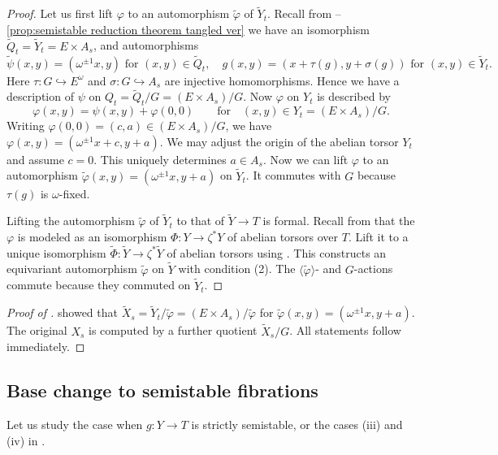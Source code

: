 \documentclass[reqno, letterpaper]{amsart}
\numberwithin{equation}{subsection}
\let\to\longrightarrow
\begin{document}
		\begin{proof}
			Let us first lift $\varphi$ to an automorphism $\tilde \varphi$ of $\tilde Y_t$. Recall from --\ref{prop:semistable reduction theorem tangled ver} we have an isomorphism $\tilde Q_t = \tilde Y_t = E \times A_s$, and automorphisms
			\[ \tilde \psi(x,y) = (\omega^{\pm1} x, y) \mbox{ for } (x,y) \in \tilde Q_t ,\quad g(x,y) = (x + \tau(g), y + \sigma(g)) \mbox{ for } (x,y) \in \tilde Y_t .\]
			Here $\tau : G \hookrightarrow E^\omega$ and $\sigma : G \hookrightarrow A_s$ are injective homomorphisms. Hence we have a description of $\psi$ on $Q_t = \tilde Q_t / G = (E \times A_s)/G$. Now $\varphi$ on $Y_t$ is described by
			\[ \varphi(x,y) = \psi(x,y) + \varphi(0,0) \qquad\mbox{for}\quad (x,y) \in Y_t = (E \times A_s)/G .\]
			Writing $\varphi(0,0) = (c,a) \in (E \times A_s)/G$, we have $\varphi(x,y) = (\omega^{\pm1}x + c, y+a)$. We may adjust the origin of the abelian torsor $Y_t$ and assume $c = 0$. This uniquely determines $a \in A_s$. Now we can lift $\varphi$ to an automorphism $\tilde \varphi (x,y) = (\omega^{\pm1}x, y+a)$ on $\tilde Y_t$. It commutes with $G$ because $\tau(g)$ is $\omega$-fixed.
			
			\medskip
			
			Lifting the automorphism $\tilde \varphi$ of $\tilde Y_t$ to that of $\tilde Y \to T$ is formal. Recall from  that the $\varphi$ is modeled as an isomorphism $\Phi : Y \to \zeta^* Y$ of abelian torsors over $T$. Lift it to a unique isomorphism $\tilde \Phi : \tilde Y \to \zeta^* \tilde Y$ of abelian torsors using . This constructs an equivariant automorphism $\tilde \varphi$ on $\tilde Y$ with condition (2). The $\langle \tilde \varphi \rangle$- and $G$-actions commute because they commuted on $\tilde Y_t$.
		\end{proof}
		
		\begin{proof} [Proof of ]
			 showed that $\tilde X_s = \tilde Y_t / \tilde \varphi = (E \times A_s) / \tilde \varphi$ for $\tilde \varphi(x,y) = (\omega^{\pm1} x, y+a)$. The original $X_s$ is computed by a further quotient $\tilde X_s/G$. All statements follow immediately.
		\end{proof}
		
		
		
	\subsection{Base change to semistable fibrations}
		Let us study the case when $g : Y \to T$ is strictly semistable, or the cases (iii) and (iv) in .
		
\end{document}
